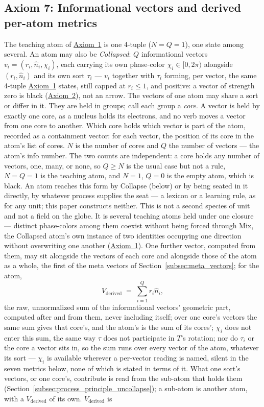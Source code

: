 \documentclass[12pt, a4paper]{article}
\begin{document}
\subsection{Axiom 7: Informational vectors and derived per-atom metrics}
\label{subsec:axiom_v1_metrics}
The teaching atom of \hyperref[subsec:axiom1]{Axiom~1} is one 4-tuple
($N=Q=1$), one state among several. An atom may also be \emph{Collapsed}: $Q$ informational
vectors $v_i=(r_i,\hat n_i,\chi_i)$, each carrying its own phase-color $\chi_i\in[0,2\pi)$ alongside $(r_i,\hat n_i)$ and its own sort $\tau_i$ --- $v_i$ together with $\tau_i$ forming, per vector, the same 4-tuple \hyperref[subsec:axiom1]{Axiom~1} states, still capped at $r_i\le 1$, and positive: a vector of strength zero is black
(\hyperref[subsec:axiom_null]{Axiom~2}), not an arrow. The vectors of one atom may share a sort or differ in it. They are held in groups; call each group a \emph{core}. A vector is held by exactly one core, as a nucleus holds its electrons, and no verb moves a vector from one core to another. Which core holds which vector is part of the atom, recorded as a containment vector: for each vector, the position of its core in the atom's list of cores. $N$ is the number of cores and $Q$ the number of vectors --- the atom's info number. The
two counts are independent: a core holds any number of vectors, one,
many, or none, so $Q\ge N$ is the usual case but not a rule, $N=Q=1$
is the teaching atom, and $N=1$, $Q=0$ is the empty atom, which is
black. An atom reaches this form by Collapse (below) or by being
seated in it directly, by whatever process supplies the seat --- a
lexicon or a learning rule, as for any unit; this paper constructs
neither. This is not a second species of unit and not a field on the
globe. It is several teaching atoms held under one closure ---
distinct phase-colors among them coexist without being forced
through Mix, the Collapsed atom's own instance of two identities occupying
one direction without overwriting one another
(\hyperref[subsec:axiom1]{Axiom~1}). One further vector, computed from
them, may sit alongside the vectors of each core and alongside those of
the atom as a whole, the first of the meta vectors of
Section~\ref{subsec:meta_vectors}; for the atom,
\[
V_{\text{derived}} \;=\; \sum_{i=1}^{Q} r_i\hat n_i,
\]
the raw, unnormalized sum of the informational vectors' geometric
part, computed after and from them, never including itself; over one core's
vectors the same sum gives that core's, and the atom's is the sum of its
cores'; $\chi_i$ does not enter this sum, the same way $\tau$ does not participate in $T$'s rotation; nor do $\tau_i$ or the core a vector sits in, so the sum runs over every vector of the atom, whatever its sort --- $\chi_i$ is available wherever a per-vector reading is named, silent in the seven metrics below, none of which is stated in terms of it. What one sort's vectors, or one core's, contribute is read from the sub-atom that holds them (Section~\ref{subsec:process_principle_uncollapse}); a sub-atom is another atom, with a $V_{\text{derived}}$ of its own. $V_{\text{derived}}$ is
\end{document}
